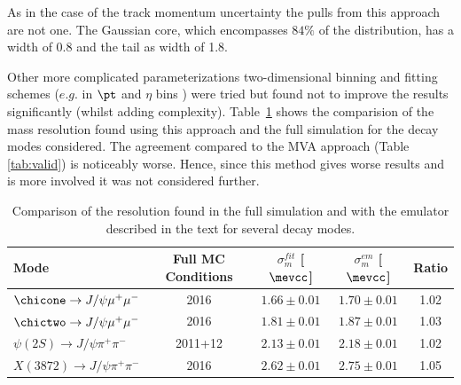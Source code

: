 As in the case of the track momentum uncertainty the pulls from this
approach are not one. The Gaussian core, which encompasses $84 \%$ of
the distribution,  has a width of 0.8  and the tail as width of 1.8.  

Other more complicated parameterizations two-dimensional binning and fitting schemes ($e.g.$ in $\pt$ and
$\eta$ bins ) were tried but found not
to improve the results significantly (whilst adding
complexity). Table~\ref{tab:valids} shows the comparision of the mass resolution
found using this approach and the full simulation for the decay modes
considered. The agreement compared to the MVA approach (Table \ref{tab:valid}) is
noticeably worse.  Hence, since this method gives worse results and is
more involved it was not considered further.

\begin{table}[htb!]
\caption{\small Comparison of the resolution found in the full
  simulation and with the emulator described in the text for several
  decay modes. }
\begin{center}
\small
\begin{tabular}{l|c|c|c|c}
Mode & Full MC Conditions & $\sigma^{fit}_m$ [$\mevcc$] &
                                                          $\sigma^{em}_m$
                                                          [$\mevcc$] &
  Ratio\\ \hline
$\chicone \rightarrow J/\psi \mu^+ \mu^-$  & 2016 & $1.66 \pm 0.01$ &
                                                                      $1.70
                                                                      \pm
                                                                      0.01$
                                                                     &
  1.02\\
$\chictwo \rightarrow J/\psi \mu^+ \mu^-$  & 2016 & $1.81 \pm 0.01$ &
                                                                      $1.87
                                                                      \pm
                                                                      0.01$
                                                                     &
  1.03\\
$\psi(2S) \rightarrow J/\psi \pi^+ \pi^-$  & 2011+12 & $2.13 \pm 0.01$
                                                        &  $2.18 \pm
                                                          0.01$ & 1.02
  \\
$X(3872) \rightarrow J/\psi \pi^+ \pi^-$  & 2016 &$2.62 \pm 0.01$ &
                                                                    $2.75
                                                                    \pm
                                                                    0.01$
                                                                     &
  1.05\\
\end{tabular}
\end{center}
\label{tab:valids}
\end{table} 
